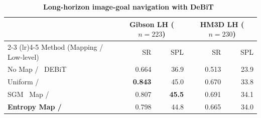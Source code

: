 \begin{table}[H]
\centering
\footnotesize
\setlength{\tabcolsep}{4pt}
\caption{
\textbf{Long-horizon image-goal navigation with DeBiT~\cite{bono2024end}}}
\label{tab:long_horizon_debit}
\begin{tabular}{@{}lrrrr@{}}
\toprule
& \multicolumn{2}{c}{Gibson LH ($n{=}223$)}
& \multicolumn{2}{c}{HM3D LH ($n{=}230$)} \\
\cmidrule(lr){2-3}
\cmidrule(lr){4-5}
Method (Mapping / Low-level) & SR & SPL & SR & SPL \\
\midrule
No Map / ~DEBiT~\cite{bono2024end}
& 0.664 & 36.9 & 0.513 & 23.9 \\
Uniform / ~\cite{bono2024end}
& \textbf{0.843} & 45.0 & 0.670 & 33.8 \\
SGM~\cite{emmons2020sparse} Map /~\cite{bono2024end}
& 0.807 & \textbf{45.5} & 0.691 & 34.1 \\
\textbf{Entropy Map /~\cite{bono2024end}}
& 0.798 & 44.8 & 0.665 & 34.0 \\
\bottomrule
\end{tabular}
\end{table}

